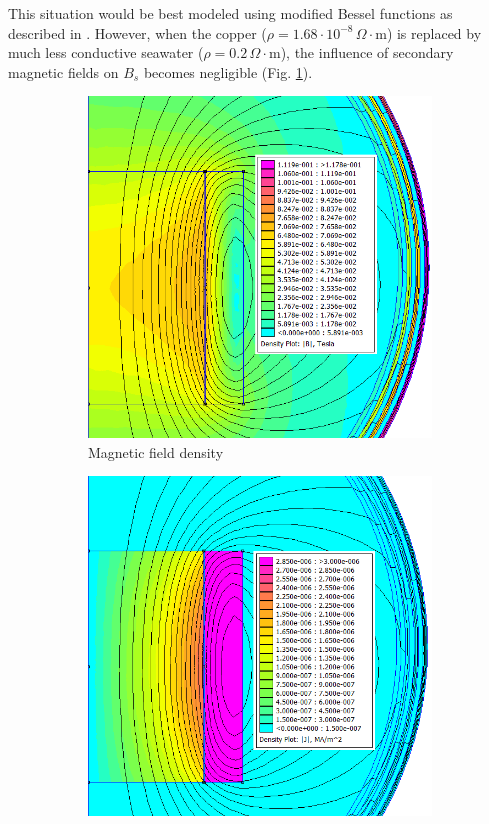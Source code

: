 \documentclass[]{article}
\begin{document}
\par This situation would be best modeled using modified Bessel functions as described in \cite{analyticeddy}. However, when the copper ($\rho =1.68\cdot 10^{-8}\, \Omega\cdot\textrm{m}$) is replaced by much less conductive seawater ($\rho =0.2\, \Omega\cdot\textrm{m}$), the influence of secondary magnetic fields on $B_{s}$ becomes negligible (Fig. \ref{fig:seawaterb}).
\begin{figure}[h]
	\centering
	\begin{subfigure}{0.45\textwidth}
		\centering
		\includegraphics[width=1\textwidth]{SeawaterB}
		\caption{Magnetic field density}
		\label{fig:seawaterb}
	\end{subfigure}
	\begin{subfigure}{0.45\textwidth}
		\centering
		\includegraphics[width=1\textwidth]{SeawaterJ}

\end{subfigure}
\end{figure}
\end{document}
